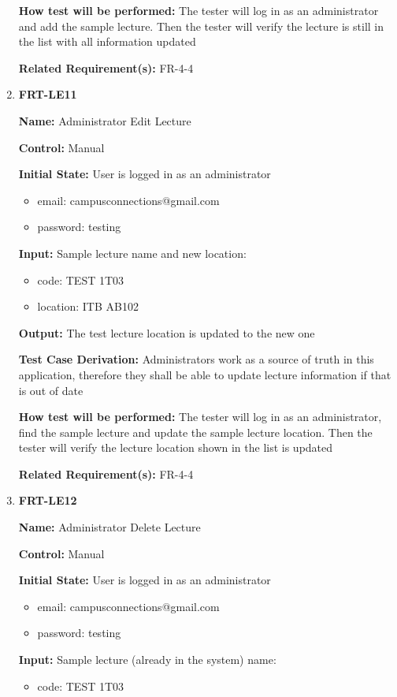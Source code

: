 \documentclass[12pt, titlepage]{article}
\begin{document}
\begin{enumerate}
\textbf{How test will be performed:} The tester will log in as an administrator and add the sample lecture. Then the tester will verify the lecture is still in the list with all information updated

\textbf{Related Requirement(s):} FR-4-4

\item{\textbf{FRT-LE11}}

\textbf{Name:} Administrator Edit Lecture

\textbf{Control:} Manual
					
\textbf{Initial State:} User is logged in as an administrator
\begin{itemize}
\item email: campusconnections@gmail.com
\item password: testing
\end{itemize}

\textbf{Input:} Sample lecture name and new location:
\begin{itemize}
\item code: TEST 1T03
\item location: ITB AB102
\end{itemize}
					
\textbf{Output:} The test lecture location is updated to the new one

\textbf{Test Case Derivation:} Administrators work as a source of truth in this application, therefore they shall be able to update lecture information if that is out of date
					
\textbf{How test will be performed:} The tester will log in as an administrator, find the sample lecture and update the sample lecture location. Then the tester will verify the lecture location shown in the list is updated

\textbf{Related Requirement(s):} FR-4-4

\item{\textbf{FRT-LE12}}

\textbf{Name:} Administrator Delete Lecture

\textbf{Control:} Manual
					
\textbf{Initial State:} User is logged in as an administrator
\begin{itemize}
\item email: campusconnections@gmail.com
\item password: testing
\end{itemize}

\textbf{Input:} Sample lecture (already in the system) name:
\begin{itemize}
\item code: TEST 1T03
\end{itemize}
					

\end{enumerate}
\end{document}
